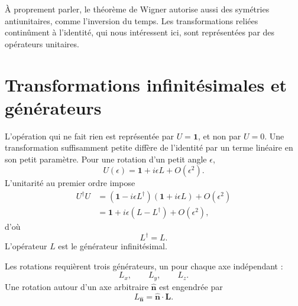 À proprement parler, le théorème de Wigner autorise aussi des symétries antiunitaires, comme l’inversion du temps. Les transformations reliées continûment à l’identité, qui nous intéressent ici, sont représentées par des opérateurs unitaires. 

\section{Transformations infinitésimales et générateurs}

L’opération qui ne fait rien est représentée par \(U=\mathbf 1\), et non par \(U=0\). Une transformation suffisamment petite diffère de l’identité par un terme linéaire en son petit paramètre. Pour une rotation d’un petit angle \(\epsilon\),
\begin{equation}
U(\epsilon)=\mathbf 1+i\epsilon L+O(\epsilon^2).
\end{equation}
L’unitarité au premier ordre impose
\begin{align}
U^\dagger U
&=\left(\mathbf 1-i\epsilon L^\dagger\right)
  \left(\mathbf 1+i\epsilon L\right)+O(\epsilon^2)\\
&=\mathbf 1+i\epsilon(L-L^\dagger)+O(\epsilon^2),
\end{align}
d’où
\begin{equation}
L^\dagger=L.
\end{equation}
L’opérateur \(L\) est le générateur infinitésimal.

Les rotations requièrent trois générateurs, un pour chaque axe indépendant :
\begin{equation}
L_x,\qquad L_y,\qquad L_z.
\end{equation}
Une rotation autour d’un axe arbitraire \(\widehat{\bm n}\) est engendrée par
\begin{equation}
L_{\widehat{\bm n}}=\widehat{\bm n}\cdot\bm L.
\end{equation}

\begin{classroomqa}
\end{classroomqa}

